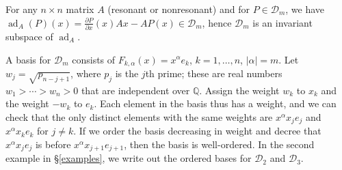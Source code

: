 \documentclass{article}
\theoremstyle{definition}
\newcommand{\ad}{\operatorname{ad}}
\begin{document}
For any $n \times n$ matrix $A$ (resonant or nonresonant) and for $P \in \mathscr{D}_m$, we have $\ad_A(P)(x)=\frac{\partial P}{\partial x}(x) Ax-AP(x) \in \mathscr{D}_m$, hence $\mathscr{D}_m$ is an invariant subspace
of $\ad_A$.

A basis for $\mathscr{D}_m$ consists of $F_{k,\alpha}(x)=x^\alpha e_k$, $k=1,\ldots,n$, $|\alpha|=m$.
Let $w_j=\sqrt{p_{n-j+1}}$, where $p_j$ is the $j$th prime; these are real numbers $w_1>\cdots>w_n>0$ that are independent over $\mathbb{Q}$. Assign the weight $w_k$ to $x_k$ and the weight $-w_k$ to $e_k$. Each element in the basis thus has a weight, and we can check that the only distinct elements with the same weights are $x^\alpha x_j e_j$ and $x^\alpha x_k e_k$ for $j \neq k$. If we order the basis decreasing in weight and decree that $x^\alpha x_j e_j$ is
before $x^\alpha x_{j+1} e_{j+1}$, then the basis is well-ordered. In the second example in \S \ref{examples}, we write out the ordered bases for
$\mathscr{D}_2$ and $\mathscr{D}_3$.
\end{document}
